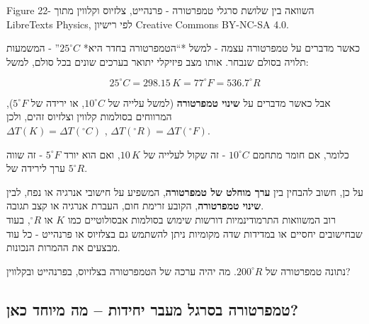 \documentclass[
  hebrew,
  letterpaper,
  DIV=11,
  numbers=noendperiod]{scrreprt}
\begin{document}
Figure {22}- {השוואה בין שלושת סרגלי טמפרטורה - פרנהייט, צלזיוס וקלווין
מתוך} LibreTexts Physics{,} {לפי רישיון} Creative Commons BY-NC-SA 4.0.

\begin{tcolorbox}[enhanced jigsaw, colback=white, arc=.35mm, coltitle=black, breakable, toptitle=1mm, leftrule=.75mm, colbacktitle=quarto-callout-tip-color!10!white, opacitybacktitle=0.6, bottomtitle=1mm, titlerule=0mm, opacityback=0, colframe=quarto-callout-tip-color-frame, title=\textcolor{quarto-callout-tip-color}{\faLightbulb}\hspace{0.5em}{עצה}, rightrule=.15mm, bottomrule=.15mm, toprule=.15mm, left=2mm]

כאשר מדברים על טמפרטורה עצמה - למשל *``הטמפרטורה בחדר היא*
\(25^\circ C\)'' - המשמעות תלויה בסולם שנבחר. אותו מצב פיזיקלי יתואר
בערכים שונים בכל סולם, למשל:

\[
25^\circ C = 298.15\,K = 77^\circ F = 536.7^\circ R
\]

אבל כאשר מדברים על \textbf{שינוי טמפרטורה} (למשל עלייה של
\(10^\circ C\), או ירידה של \(5^\circ F\)), המרווחים בסולמות קלווין
וצלזיוס זהים, ולכן\\
\(\Delta T(K) = \Delta T(^\circ C)\) ,
\(\Delta T(^\circ R) = \Delta T(^\circ F)\).

כלומר, אם חומר מתחמם \(10^\circ C\) - זה שקול לעלייה של \(10\,K\), ואם
הוא יורד \(5^\circ F\) - זה שווה ערך לירידה של \(5^\circ R\).

על כן, חשוב להבחין בין \textbf{ערך מוחלט של טמפרטורה}, המשפיע על חישובי
אנרגיה או נפח, לבין \textbf{שינוי טמפרטורה}, הקובע זרימת חום, העברת
אנרגיה או קצב תגובה.\\
רוב המשוואות התרמודינמיות דורשות שימוש בסולמות אבסולוטיים כמו \(K\) או
\(^\circ R\), בעוד שבחישובים יחסיים או במדידות שדה מקומיות ניתן להשתמש
גם בצלזיוס או פרנהייט - כל עוד מבצעים את ההמרות הנכונות.

\end{tcolorbox}

נתונה טמפרטורה של \(200^\circ R\). מה יהיה ערכה של הטמפרטורה בצלזיוס,
בפרנהייט ובקלווין?

\subsection{טמפרטורה בסרגל מעבר יחידות -- מה מיוחד
כאן?}\label{ux5d8ux5deux5e4ux5e8ux5d8ux5d5ux5e8ux5d4-ux5d1ux5e1ux5e8ux5d2ux5dc-ux5deux5e2ux5d1ux5e8-ux5d9ux5d7ux5d9ux5d3ux5d5ux5ea-ux5deux5d4-ux5deux5d9ux5d5ux5d7ux5d3-ux5dbux5d0ux5df}
\end{document}
